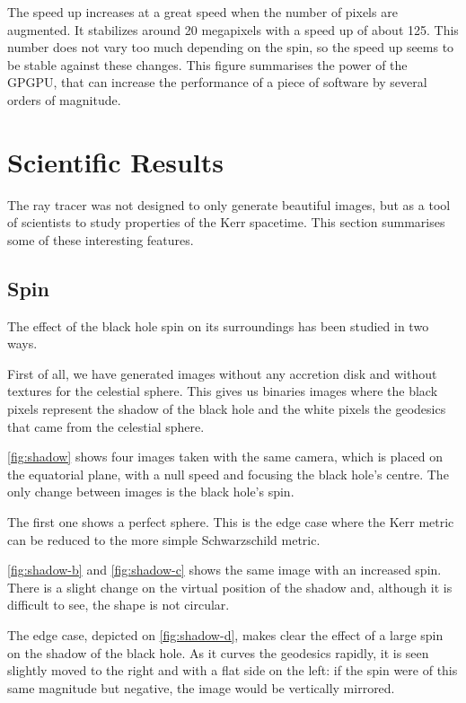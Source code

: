 The speed up increases at a great speed when the number of pixels are augmented. It stabilizes around 20 megapixels with a speed up of about 125. This number does not vary too much depending on the spin, so the speed up seems to be stable against these changes. This figure summarises the power of the \ac{GPGPU}, that can increase the performance of a piece of software by several orders of magnitude.


\section{Scientific Results}

The ray tracer was not designed to only generate beautiful images, but as a tool of scientists to study properties of the Kerr spacetime. This section summarises some of these interesting features.

\subsection{Spin}

The effect of the black hole spin on its surroundings has been studied in two ways.

First of all, we have generated images without any accretion disk and without textures for the celestial sphere. This gives us binaries images where the black pixels represent the shadow of the black hole and the white pixels the geodesics that came from the celestial sphere.

\autoref{fig:shadow} shows four images taken with the same camera, which is placed on the equatorial plane, with a null speed and focusing the black hole's centre. The only change between images is the black hole's spin.

The first one shows a perfect sphere. This is the edge case where the Kerr metric can be reduced to the more simple Schwarzschild metric.

\autoref{fig:shadow-b} and \autoref{fig:shadow-c} shows the same image with an increased spin. There is a slight change on the virtual position of the shadow and, although it is difficult to see, the shape is not circular.

The edge case, depicted on \autoref{fig:shadow-d}, makes clear the effect of a large spin on the shadow of the black hole. As it curves the geodesics rapidly, it is seen slightly moved to the right and with a flat side on the left: if the spin were of this same magnitude but negative, the image would be vertically mirrored.

